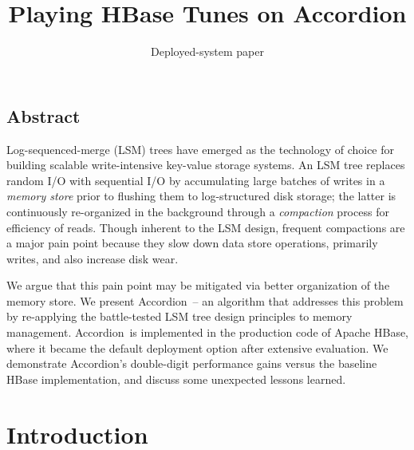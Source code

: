\documentclass[letterpaper,twocolumn,10pt]{article}
\newcommand{\remove}[1]{}
\newcommand{\tb}{\hspace{5mm}}
\newcommand{\sys}{Accordion}
\begin{document}
\date{}

\title{\Large \bf  Playing HBase Tunes on \sys}


\author{
\remove{
Edward Bortnikov\footnotemark[1]  \tb
Anastasia Braginsky\footnotemark[1]  \tb
Eshcar Hillel\footnotemark[1] \tb 
Idit Keidar\footnotemark[1] \footnotemark[2] \\
	\footnotemark[1] Yahoo Research\ \ \footnotemark[2] Technion  \\ [2mm]
}
Deployed-system paper
} %

\maketitle




\subsection*{Abstract}

Log-sequenced-merge (LSM) trees have emerged as the technology of choice for building scalable 
write-intensive key-value storage systems. An LSM tree replaces random I/O with sequential 
I/O by accumulating large batches of writes in a \emph{memory store} prior to flushing them to log-structured 
disk storage; the latter is continuously re-organized in the background through a \emph{compaction}
process for efficiency of reads. Though inherent to the LSM design, frequent compactions are a major pain point 
because they slow down data store operations, primarily writes, and also increase disk wear.

We argue that this pain point may be mitigated via better  organization of the memory store.
We present \sys\ -- an algorithm that addresses this problem by re-applying
the battle-tested LSM tree design principles to memory management. 
\sys\ is implemented in the production code of Apache HBase, where it became the default deployment option 
after extensive evaluation. We demonstrate \sys's double-digit performance gains versus 
the baseline HBase implementation, and discuss some unexpected lessons learned. 


\section{Introduction} \label{sec:intro}
 
\end{document}
